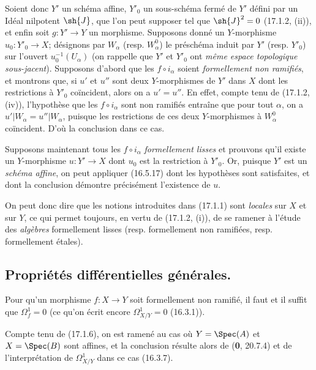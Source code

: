 Soient donc $Y'$ un schéma affine, $Y'_0$ un sous-schéma fermé de $Y'$ défini par un Idéal nilpotent $\sh{J}$, que l'on peut supposer tel que $\sh{J}^2=0$ (17.1.2, (ii)), et enfin soit $g:Y'\to Y$ un morphisme. Supposons donné un $Y$-morphisme $u_0:Y'_0\to X$; désignons par $W_\alpha$ (resp. $W^0_\alpha$) le préschéma induit par $Y'$ (resp. $Y'_0$) sur l'ouvert $u_0^{-1}(U_\alpha)$ (on rappelle que $Y'$ et $Y'_0$ ont \emph{même espace topologique sous-jacent}). Supposons d'abord que les $f\circ i_\alpha$ soient \emph{formellement non ramifiés}, et montrons que, si $u'$ et $u''$ sont deux $Y$-morphismes de $Y'$ dans $X$ dont les restrictions à $Y'_0$ coïncident, alors on a $u'=u''$. En effet, compte tenu de (17.1.2, (iv)), l'hypothèse que les $f\circ i_\alpha$ sont non ramifiés entraîne que pour tout $\alpha$, on a $u'|W_\alpha=u''|W_\alpha$, puisque les restrictions de ces deux $Y$-morphismes à $W^0_\alpha$ coïncident. D'où la conclusion dans ce cas.

Supposons maintenant tous les $f\circ i_\alpha$ \emph{formellement lisses} et prouvons qu'il existe un $Y$-morphisme $u:Y'\to X$ dont $u_0$ est la restriction à $Y'_0$. Or, puisque $Y'$ est un \emph{schéma affine}, on peut appliquer (16.5.17) dont les hypothèses sont satisfaites, et dont la conclusion démontre précisément l'existence de $u$.

On peut donc dire que les notions introduites dans (17.1.1) sont \emph{locales} sur $X$ et sur $Y$, ce qui permet toujours, en vertu de (17.1.2, (i)), de se ramener à l'étude des \emph{algèbres} formellement lisses (resp. formellement non ramifiées, resp. formellement étales).

\subsection{Propriétés différentielles générales.}

\begin{proposition}[17.2.1]
\label{IV.17.2.1}
Pour qu'un morphisme $f:X\to Y$ soit formellement non ramifié, il faut et il suffit que $\varOmega_f^1=0$ \textup{(ce qu'on écrit encore $\varOmega_{X/Y}^1=0$ (16.3.1))}.
\end{proposition}

Compte tenu de (17.1.6), on est ramené au cas où $Y=\Spec(A)$ et $X=\Spec(B)$ sont affines, et la conclusion résulte alors de (\textbf{0}, 20.7.4) et de l'interprétation de $\varOmega_{X/Y}^1$ dans ce cas (16.3.7).


